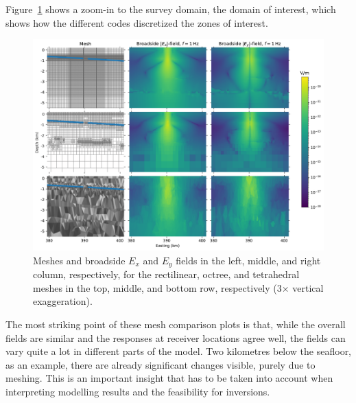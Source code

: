 \documentclass[extra, camera,%
]{gji}
\begin{document}
Figure~\ref{fig:results-marlim_survey} shows a zoom-in to the survey domain, the domain of interest, which shows how the different codes discretized the zones of interest.
%
\begin{figure}
  \centering
  \includegraphics[width=.9\linewidth]{figures/results-marlim_survey}
  \caption{Meshes and broadside $E_x$ and $E_y$ fields in the left, middle, and right column, respectively, for the rectilinear, octree, and tetrahedral meshes in the top, middle, and bottom row, respectively (3$\times$ vertical exaggeration).}
  \label{fig:results-marlim_survey}
\end{figure}
%
The most striking point of these mesh comparison plots is that, while the overall fields are similar and the responses at receiver locations agree well, the fields can vary quite a lot in different parts of the model. Two kilometres below the seafloor, as an example, there are already significant changes visible, purely due to meshing. This is an important insight that has to be taken into account when interpreting modelling results and the feasibility for inversions.
\end{document}

